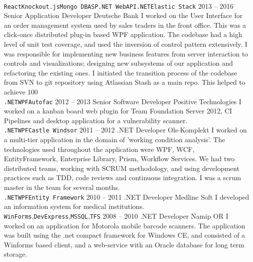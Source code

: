 \documentclass[9pt]{developercv} %
\begin{document}
\begin{entrylist}
{		\\ \texttt{React}\slashsep\texttt{Knockout.js}\slashsep\texttt{Mongo DB}\slashsep\texttt{ASP.NET WebAPI}\texttt{.NET}\slashsep\texttt{Elastic Stack}}
	\entry
		{2013 -- 2016}
		{Senior Application Developer}
		{Deutsche Bank}
		{I worked on the User Interface for an order management system used by sales traders in the front office. This was a click-once distributed plug-in based WPF application. The codebase had a high level of unit test coverage, and used the inversion of control pattern extensively. I was responsible for implementing new business features from server interaction to controls and visualizations; designing new subsystems of our application and refactoring the existing ones. I initiated the transition process of the codebase from SVN to git repository using Atlassian Stash as a main repo. This helped to achieve 100%
		\\ \texttt{.NET}\slashsep\texttt{WPF}\slashsep\texttt{Autofac}}
	\entry
		{2012 -- 2013}
		{Senior Software Developer}
		{Positive Technologies}
		{I worked on a kanban board web plugin for Team Foundation Server 2012, CI Pipelines and desktop application for a vulnerability scanner.
		\\ \texttt{.NET}\slashsep\texttt{WPF}\slashsep\texttt{Castle Windsor}}
	\entry
		{2011 -- 2012}
		{.NET Developer}
		{Ols-Komplekt}
		{I worked on a multi-tier application in the domain of 'working condition analysis'. The technologies used throughout the application were WPF, WCF, EntityFramework, Enterprise Library, Prism, Workflow Services. We had two distributed teams, working with SCRUM methodology, and using development practices such as TDD, code reviews and continuous integration. I was a scrum master in the team for several months.
		\\ \texttt{.NET}\slashsep\texttt{WPF}\slashsep\texttt{Entity Framework}}
	\entry
		{2010 -- 2011}
		{.NET Developer}
		{Medline Soft}
		{I developed an information system for medical institutions.
		\\ \texttt{WinForms},\slashsep\texttt{DevExpress},\slashsep\texttt{MSSQL},\slashsep\texttt{TFS}}
	\entry
		{2008 -- 2010}
		{.NET Developer}
		{Namip OR}
		{I worked on an application for Motorola mobile barcode scanners. The application was built using the .net compact framework for Windows CE, and consisted of a Winforms based client, and a web-service with an Oracle database for long term storage.}
\end{entrylist}
\end{document}
